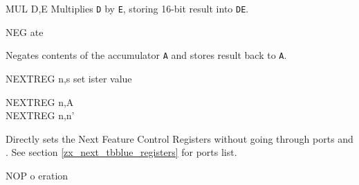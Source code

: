 \begin{basedescript}{
	\desclabelstyle{\multilinelabel}
	\desclabelwidth{3cm}}
\begin{DetailItem}{MUL D,E\ZXN}
		Multiplies {\tt D} by {\tt E}, storing 16-bit result into {\tt DE}.

		\begin{DetailEffects}
			\FlagsMULde
		\end{DetailEffects}
				
		\begin{DetailTiming}
			\DetailTime{2}{8}
		\end{DetailTiming}

	\end{DetailItem}

	\begin{DetailItem}{NEG}
		{\IH{NEG}ate}
		{\SymNEG}

		Negates contents of the accumulator {\tt A} and stores result back to {\tt A}.

		\begin{DetailEffects}[p]
			\FlagsNEG
		\end{DetailEffects}
				
		\begin{DetailTiming}
		\end{DetailTiming}

	\end{DetailItem}

	\begin{DetailItem}{\small NEXTREG n,s{\scriptsize \ZXN}}
		{set  ister value}
		{\SymNEXTREG{s}}

		\begin{DetailVariants}
			NEXTREG n,A\\
			NEXTREG n,n'
		\end{DetailVariants}

		Directly sets the Next Feature Control Registers without going through ports  and . See section \ref{zx_next_tbblue_registers} for ports list.

		\begin{DetailEffects}
			\FlagsNEXTREGna
		\end{DetailEffects}		
		
		\begin{DetailTiming}
			\DetailTime[r,A]{4}{17}
			\DetailTime[r,n]{5}{20}
		\end{DetailTiming}

	\end{DetailItem}

	\begin{DetailItem}{NOP}
		{o eration}
		{}


\end{DetailItem}
\end{basedescript}
